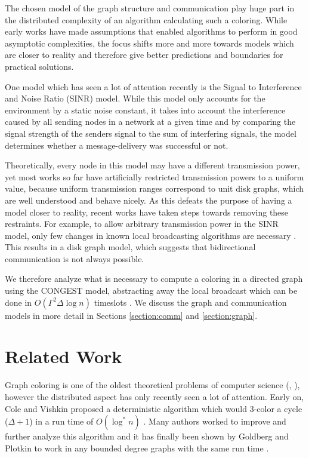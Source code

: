 The chosen model of the graph structure and communication play huge part in the distributed complexity of an algorithm calculating such a coloring. While early works have made assumptions that enabled algorithms to perform in good asymptotic complexities, the focus shifts more and more towards models which are closer to reality and therefore give better predictions and boundaries for practical solutions.

One model which has seen a lot of attention recently is the Signal to Interference and Noise Ratio (SINR) model. While this model only accounts for the environment by a static noise constant, it takes into account the interference caused by all sending nodes in a network at a given time and by comparing the signal strength of the senders signal to the sum of interfering signals, the model determines whether a message-delivery was successful or not.

Theoretically, every node in this model may have a different transmission power, yet most works so far have artificially restricted transmission powers to a uniform value, because uniform transmission ranges correspond to unit disk graphs, which are well understood and behave nicely. As this defeats the purpose of having a model closer to reality, recent works have taken steps towards removing these restraints. For example, to allow arbitrary transmission power in the SINR model, only few changes in known local broadcasting algorithms are necessary \cite{DBLP:journals/corr/FuchsW14}. This results in a disk graph model, which suggests that bidirectional communication is not always possible.

We therefore analyze what is necessary to compute a coloring in a directed graph using the CONGEST model, abstracting away the local broadcast which can be done in $O(\Gamma^2 \Delta \log n)$ timeslots \cite{DBLP:journals/corr/FuchsW14}. We discuss the graph and communication models in more detail in Sections \ref{section:comm} and \ref{section:graph}.

\section{Related Work}

Graph coloring is one of the oldest theoretical problems of computer science (\cite{birkhoff1912determinant}, \cite{whitney1931coloring}), however the distributed aspect has only recently seen a lot of attention. Early on, Cole and Vishkin proposed a deterministic algorithm which would 3-color a cycle ($\Delta+1$) in a run time of $O(\log^* n)$ \cite{cole1986deterministic}. Many authors worked to improve and further analyze this algorithm and it has finally been shown by Goldberg and Plotkin to work in any bounded degree graphs with the same run time \cite{goldberg1987parallel}. 

